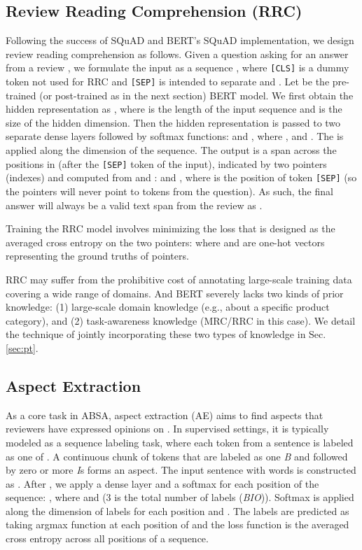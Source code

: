 \documentclass[11pt,a4paper]{article}
\begin{document}
\subsection{Review Reading Comprehension (RRC)}
\label{sec:rrc}
Following the success of SQuAD \cite{rajpurkar2016squad} and BERT's SQuAD implementation, we design review reading comprehension as follows.
Given a question  asking for an answer from a review , we formulate the input as a sequence , where \texttt{[CLS]} is a dummy token not used for RRC and \texttt{[SEP]} is intended to separate  and .
Let  be the pre-trained (or post-trained as in the next section) BERT model. We first obtain the hidden representation as , where  is the length of the input sequence and  is the size of the hidden dimension. Then the hidden representation is passed to two separate dense layers followed by softmax functions:  and , where ,  and . The  is applied along the dimension of the sequence.
The output is a span across the positions in  (after the \texttt{[SEP]} token of the input), indicated by two pointers (indexes)  and  computed from  and :  and , where  is the position of token \texttt{[SEP]} (so the pointers will never point to tokens from the question).
As such, the final answer will always be a valid text span from the review as .

Training the RRC model involves minimizing the loss that is designed as the averaged cross entropy on the two pointers:  where  and  are one-hot vectors representing the ground truths of pointers.

RRC may suffer from the prohibitive cost of annotating large-scale training data covering a wide range of domains. 
And BERT severely lacks two kinds of prior knowledge: (1) large-scale domain knowledge (e.g., about a specific product category), and (2) task-awareness knowledge (MRC/RRC in this case).
We detail the technique of jointly incorporating these two types of knowledge in Sec. \ref{sec:pt}.

\subsection{Aspect Extraction}
As a core task in ABSA, aspect extraction (AE) aims to find aspects that reviewers have expressed opinions on \cite{hu2004mining}. 
In supervised settings, it is typically modeled as a sequence labeling task, where each token from a sentence is labeled as one of . A continuous chunk of tokens that are labeled as one \textit{B} and followed by zero or more \textit{I}s forms an aspect.
The input sentence with  words is constructed as .
After , we apply a dense layer and a softmax for each position of the sequence: , where  and  (3 is the total number of labels (\textit{BIO})).  Softmax is applied along the dimension of labels for each position and . The labels are predicted as taking argmax function at each position of  and the loss function is the averaged cross entropy across all positions of a sequence.
\end{document}
